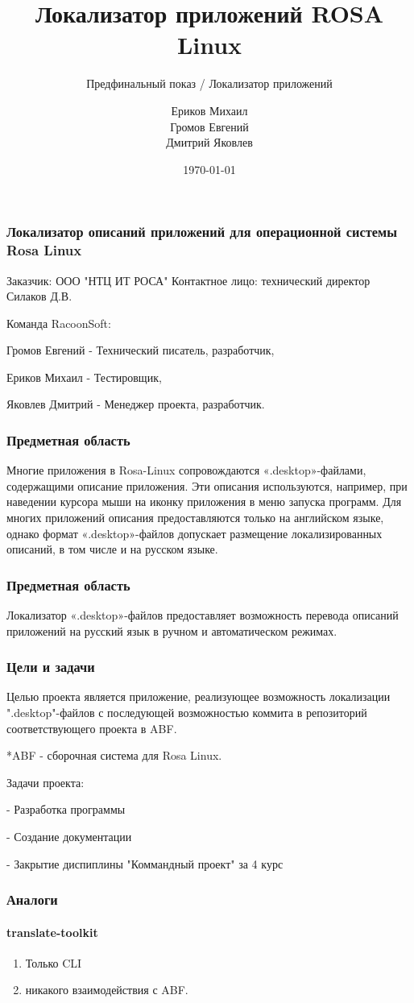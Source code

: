 \documentclass{beamer}
\title[Заголовок]{Локализатор приложений ROSA Linux}
\subtitle{Предфинальный показ / Локализатор приложений}
\author[RacoonSoft]{Ериков Михаил \\ Громов Евгений \\ Дмитрий Яковлев}
\institute[Высшая школа экономики]{Команда RacoonSoft \\ Национальный исследовательский университет \\ «Высшая школа экономики» (Москва)}
\date{\today}
\begin{document}
	

\frame[plain]{\titlepage}	

\begin{frame}
\frametitle{Локализатор описаний приложений для операционной системы Rosa Linux}

Заказчик: ООО "НТЦ ИТ РОСА"
Контактное лицо: технический директор Силаков Д.В.

Команда RacoonSoft:

Громов Евгений - Технический писатель, разработчик,

Ериков Михаил - Тестировщик,

Яковлев Дмитрий - Менеджер проекта, разработчик.

\end{frame}
\begin{frame}
\frametitle{Предметная область}

Многие приложения в Rosa-Linux сопровождаются «.desktop»-файлами, содержащими описание приложения. 
Эти описания используются, например, при наведении курсора мыши на иконку приложения в меню запуска программ.
Для многих приложений описания предоставляются только на английском языке, однако формат «.desktop»-файлов 
допускает размещение локализированных описаний, в том числе и на русском языке.
\end{frame}
\begin{frame}
\frametitle{Предметная область}
Локализатор «.desktop»-файлов предоставляет возможность перевода описаний приложений на русский язык в ручном и автоматическом режимах.
\end{frame}
\begin{frame}
\frametitle{Цели и задачи}

Целью проекта является приложение, реализующее возможность локализации ".desktop"-файлов с 
последующей возможностью коммита в репозиторий соответствующего проекта в ABF.

*ABF - сборочная система для Rosa Linux.

Задачи проекта:

- Разработка программы

- Создание документации

- Закрытие диспиплины "Коммандный проект" за 4 курс
\end{frame}



\begin{frame}
	\frametitle{Аналоги}
	\framesubtitle{translate-toolkit}
	\begin{enumerate}
		\item 	Только CLI
\item			никакого взаимодействия с ABF.
	\end{enumerate}
		\end{frame}
		
\end{document}
